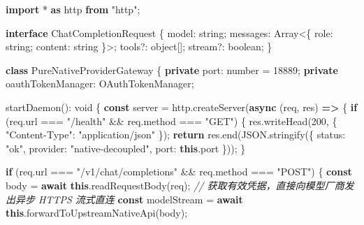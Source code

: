 \documentclass[
]{ctexart}
\newenvironment{Shaded}{}{}
\newcommand{\AttributeTok}[1]{\textcolor[rgb]{0.49,0.56,0.16}{#1}}
\newcommand{\BuiltInTok}[1]{\textcolor[rgb]{0.00,0.50,0.00}{#1}}
\newcommand{\CommentTok}[1]{\textcolor[rgb]{0.38,0.63,0.69}{\textit{#1}}}
\newcommand{\ControlFlowTok}[1]{\textcolor[rgb]{0.00,0.44,0.13}{\textbf{#1}}}
\newcommand{\DataTypeTok}[1]{\textcolor[rgb]{0.56,0.13,0.00}{#1}}
\newcommand{\DecValTok}[1]{\textcolor[rgb]{0.25,0.63,0.44}{#1}}
\newcommand{\FunctionTok}[1]{\textcolor[rgb]{0.02,0.16,0.49}{#1}}
\newcommand{\ImportTok}[1]{\textcolor[rgb]{0.00,0.50,0.00}{\textbf{#1}}}
\newcommand{\KeywordTok}[1]{\textcolor[rgb]{0.00,0.44,0.13}{\textbf{#1}}}
\newcommand{\NormalTok}[1]{#1}
\newcommand{\OperatorTok}[1]{\textcolor[rgb]{0.40,0.40,0.40}{#1}}
\newcommand{\StringTok}[1]{\textcolor[rgb]{0.25,0.44,0.63}{#1}}
\renewcommand{\_}{\discretionary{}{}{\textunderscore}}
\begin{document}
\begin{Shaded}
\begin{Highlighting}[]
\ImportTok{import} \OperatorTok{*} \ImportTok{as}\NormalTok{ http }\ImportTok{from} \StringTok{"http"}\OperatorTok{;}

\KeywordTok{interface}\NormalTok{ ChatCompletionRequest \{}
\NormalTok{  model}\OperatorTok{:} \DataTypeTok{string}\OperatorTok{;}
\NormalTok{  messages}\OperatorTok{:} \BuiltInTok{Array}\OperatorTok{\textless{}}\NormalTok{\{ role}\OperatorTok{:} \DataTypeTok{string}\OperatorTok{;}\NormalTok{ content}\OperatorTok{:} \DataTypeTok{string}\NormalTok{ \}}\OperatorTok{\textgreater{};}
\NormalTok{  tools}\OperatorTok{?:} \DataTypeTok{object}\NormalTok{[]}\OperatorTok{;}
\NormalTok{  stream}\OperatorTok{?:} \DataTypeTok{boolean}\OperatorTok{;}
\NormalTok{\}}

\KeywordTok{class}\NormalTok{ PureNativeProviderGateway \{}
  \KeywordTok{private}\NormalTok{ port}\OperatorTok{:} \DataTypeTok{number} \OperatorTok{=} \DecValTok{18889}\OperatorTok{;}
  \KeywordTok{private}\NormalTok{ oauthTokenManager}\OperatorTok{:}\NormalTok{ OAuthTokenManager}\OperatorTok{;}

  \FunctionTok{startDaemon}\NormalTok{()}\OperatorTok{:} \DataTypeTok{void}\NormalTok{ \{}
    \KeywordTok{const}\NormalTok{ server }\OperatorTok{=}\NormalTok{ http}\OperatorTok{.}\FunctionTok{createServer}\NormalTok{(}\KeywordTok{async}\NormalTok{ (req}\OperatorTok{,}\NormalTok{ res) }\KeywordTok{=\textgreater{}}\NormalTok{ \{}
      \ControlFlowTok{if}\NormalTok{ (req}\OperatorTok{.}\AttributeTok{url} \OperatorTok{===} \StringTok{"/health"} \OperatorTok{\&\&}\NormalTok{ req}\OperatorTok{.}\AttributeTok{method} \OperatorTok{===} \StringTok{"GET"}\NormalTok{) \{}
\NormalTok{        res}\OperatorTok{.}\FunctionTok{writeHead}\NormalTok{(}\DecValTok{200}\OperatorTok{,}\NormalTok{ \{ }\StringTok{"Content{-}Type"}\OperatorTok{:} \StringTok{"application/json"}\NormalTok{ \})}\OperatorTok{;}
        \ControlFlowTok{return}\NormalTok{ res}\OperatorTok{.}\FunctionTok{end}\NormalTok{(}\BuiltInTok{JSON}\OperatorTok{.}\FunctionTok{stringify}\NormalTok{(\{ status}\OperatorTok{:} \StringTok{"ok"}\OperatorTok{,}\NormalTok{ provider}\OperatorTok{:} \StringTok{"native{-}decoupled"}\OperatorTok{,}\NormalTok{ port}\OperatorTok{:} \KeywordTok{this}\OperatorTok{.}\AttributeTok{port}\NormalTok{ \}))}\OperatorTok{;}
\NormalTok{      \}}

      \ControlFlowTok{if}\NormalTok{ (req}\OperatorTok{.}\AttributeTok{url} \OperatorTok{===} \StringTok{"/v1/chat/completions"} \OperatorTok{\&\&}\NormalTok{ req}\OperatorTok{.}\AttributeTok{method} \OperatorTok{===} \StringTok{"POST"}\NormalTok{) \{}
        \KeywordTok{const}\NormalTok{ body }\OperatorTok{=} \ControlFlowTok{await} \KeywordTok{this}\OperatorTok{.}\FunctionTok{readRequestBody}\NormalTok{(req)}\OperatorTok{;}
        \CommentTok{// 获取有效凭据，直接向模型厂商发出异步 HTTPS 流式直连}
        \KeywordTok{const}\NormalTok{ modelStream }\OperatorTok{=} \ControlFlowTok{await} \KeywordTok{this}\OperatorTok{.}\FunctionTok{forwardToUpstreamNativeApi}\NormalTok{(body)}\OperatorTok{;}


\end{Highlighting}
\end{Shaded}
\end{document}
